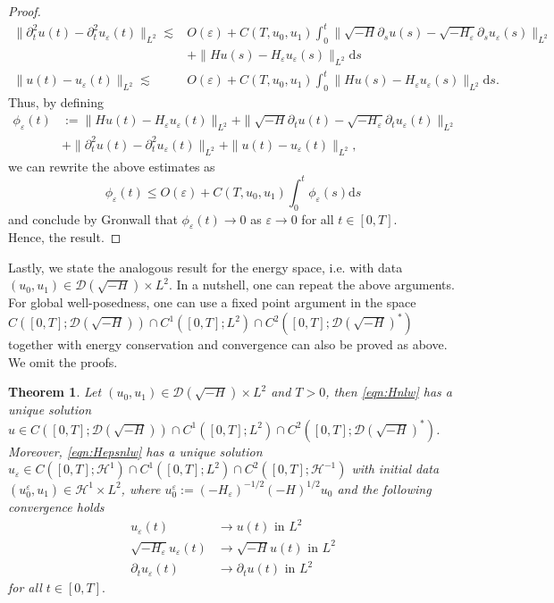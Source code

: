 \documentclass[11pt, oneside]{article}   	%
\newcommand{\mathd}{\mathrm{d}}
\newtheorem{theorem}{Theorem}[section]
\newcommand{\ssp}{\mathscr{H}}
\begin{document}
\begin{proof}
\begin{align*}
\|\partial^2_tu(t)-\partial^2_tu_\varepsilon(t)\|_{L^2}\lesssim& O(\varepsilon)+C(T,u_0,u_1)\int_{0}^{t}\|\sqrt{-H}\partial_su(s)-\sqrt{-H_\varepsilon}\partial_su_\varepsilon(s)\|_{L^2}\\&+\|Hu(s)-H_\varepsilon u_\varepsilon(s)\|_{L^2}\mathd s\\
\|u(t)-u_\varepsilon(t)\|_{L^2}\lesssim& O(\varepsilon)+C(T,u_0,u_1)\int_{0}^{t}\|Hu(s)-H_\varepsilon u_\varepsilon(s)\|_{L^2}\mathd s.
\end{align*}
Thus, by defining 
\begin{align*}
 \phi_\varepsilon(t) &:= \|Hu(t)-H_\varepsilon u_\varepsilon(t)\|_{L^2}+\|\sqrt{-H}\partial_tu(t)-\sqrt{-H_\varepsilon}\partial_tu_\varepsilon(t)\|_{L^2}\\ &+\|\partial^2_tu(t)-\partial^2_tu_\varepsilon(t)\|_{L^2}+\|u(t)-u_\varepsilon(t)\|_{L^2},
\end{align*}
we can rewrite the above estimates as
\[
\phi_\varepsilon(t)\le O(\varepsilon)+C(T,u_0,u_1)\int_{0}^{t}\phi_\varepsilon(s)\mathd s
\]
and conclude by Gronwall that $\phi_\varepsilon(t)\to0$ as $\varepsilon\to 0$ for all $t\in[0,T].$\\
Hence, the result.
\end{proof}
Lastly, we state the analogous result for the energy space, i.e. with data $(u_0,u_1)\in\mathscr{D}(\sqrt{-H})\times L^2.$ In a nutshell, one can repeat the above arguments. For global well-posedness, one can use a fixed point argument in the space $C([0,T];\mathscr{D}(\sqrt{-H}))\cap C^1([0,T];L^2)\cap C^2([0,T];\mathscr{D}(\sqrt{-H})^\ast)$ together with energy conservation and  convergence can also be proved as above.  We omit the proofs.
\begin{theorem} \label{thm:waveenergy}
Let $(u_0,u_1)\in\mathscr{D}(\sqrt{-H})\times L^2$ and $T>0$, then \eqref{eqn:Hnlw} has a unique solution $u\in C([0,T];\mathscr{D}(\sqrt{-H}))\cap C^1([0,T];L^2)\cap C^2([0,T];\mathscr{D}(\sqrt{-H})^\ast)$. Moreover, \eqref{eqn:Hepsnlw} has a unique solution $u_\varepsilon\in C([0,T];\ssp^1)\cap C^1([0,T];L^2)\cap C^2([0,T];\ssp^{-1})$ with initial data $(u^\varepsilon_0,u_1)\in \ssp^1\times L^2$, where $u^\varepsilon_0:=(-H_\varepsilon)^{-1/2}(-H)^{1/2}u_0$ and the following convergence holds
\begin{align*}
u_\varepsilon(t)&\to u(t) \text{ in }L^2\\
 \sqrt{-H_\varepsilon}u_\varepsilon(t)&\to \sqrt{-H}u(t) \text{ in }L^2\\
 \partial_tu_\varepsilon(t)&\to \partial_tu(t) \text{ in }L^2
\end{align*}
for all $t\in[0,T].$
\end{theorem} 
\end{document}
